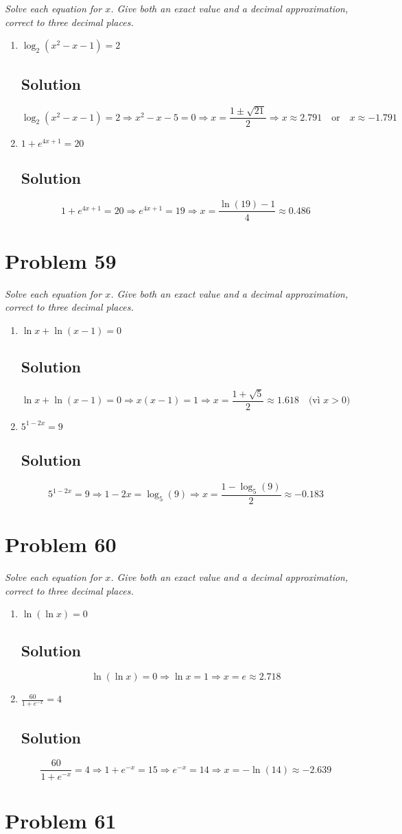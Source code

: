 \documentclass[11pt]{article}
\newcommand{\soln}{\subsection*}
\newcommand{\qn}{\textit}
\newcommand{\eqtext}[1]{\quad\text{#1}\quad}
\begin{document}
\qn{Solve each equation for $x$. Give both an exact value and a decimal approximation, correct to three decimal places.}
\begin{enumerate}
	\item \qn{$\log_2(x^2-x-1)=2$}
	\soln{Solution}
	$$\log_2(x^2-x-1)=2 \Rightarrow x^2-x-5=0 \Rightarrow x=\frac{1\pm\sqrt{21}}{2} \Rightarrow x\approx2.791 \eqtext{or} x\approx-1.791$$
	
	\item \qn{$1+e^{4x+1}=20$}
	\soln{Solution}
	$$1+e^{4x+1}=20 \Rightarrow e^{4x+1}=19 \Rightarrow x=\frac{\ln(19)-1}{4}\approx0.486$$
\end{enumerate}

\section*{Problem 59}

\qn{Solve each equation for $x$. Give both an exact value and a decimal approximation, correct to three decimal places.}
\begin{enumerate}
	\item \qn{$\ln{x}+\ln(x-1)=0$}
	\soln{Solution}
	$$\ln{x}+\ln(x-1)=0 \Rightarrow x(x-1)=1 \Rightarrow x=\frac{1+\sqrt{5}}{2}\approx1.618 \eqtext{(vì $x>0$)}$$
	
	\item \qn{$5^{1-2x}=9$}
	\soln{Solution}
	$$5^{1-2x}=9 \Rightarrow 1-2x=\log_5(9) \Rightarrow x=\frac{1-\log_5(9)}{2}\approx-0.183$$
\end{enumerate}

\section*{Problem 60}

\qn{Solve each equation for $x$. Give both an exact value and a decimal approximation, correct to three decimal places.}
\begin{enumerate}
	\item \qn{$\ln(\ln{x})=0$}
	\soln{Solution}
	$$\ln(\ln{x})=0 \Rightarrow \ln{x}=1 \Rightarrow x=e\approx2.718$$
	
	\item \qn{$\frac{60}{1+e^{-x}}=4$}
	\soln{Solution}
	$$\frac{60}{1+e^{-x}}=4 \Rightarrow 1+e^{-x}=15 \Rightarrow e^{-x}=14 \Rightarrow x=-\ln(14)\approx-2.639$$
\end{enumerate}

\section*{Problem 61}
\end{document}
